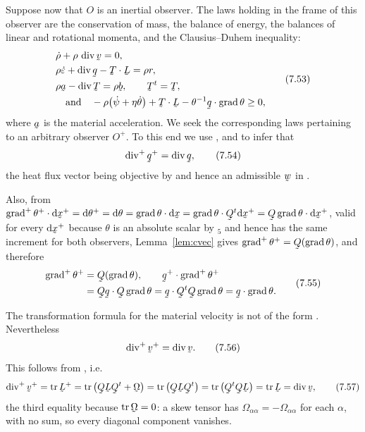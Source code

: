 Suppose now that $O$ is an inertial observer. The laws holding in the
frame of this observer are the conservation of mass, the balance of
energy, the balances of linear and rotational momenta, and the
Clausius--Duhem inequality:
\begin{equation}
\begin{aligned}
   &\dot\rho+\rho\,\dvg\bv=0,\\
   &\rho\dot\eps+\dvg\bq-\bT\cdot\bL=\rho r,\\
   &\rho\ba-\dvg\bT=\rho\bb,\qquad \bT^{t}=\bT,\\
   &\quad\text{and}\quad
   -\rho\big(\dot\psi+\eta\dot\theta\big)+\bT\cdot\bL
   -\theta^{-1}\ip\bq{\grad\theta}\geq0 ,
\end{aligned}
   \tag{7.53}\label{eq:7.53}
\end{equation}
where $\ba$ is the material acceleration. We seek the corresponding laws
pertaining to an arbitrary observer $O^{+}$. To this end we use
,  and  to infer that
\begin{equation}
   \dvg^{+}\bq^{+}=\dvg\bq ,
   \tag{7.54}\label{eq:7.54}
\end{equation}
the heat flux vector being objective by  and hence an
admissible $\bw$ in .

Also, from $\ip{\grad^{+}\theta^{+}}{\dl\bx^{+}}=\dl\theta^{+}
=\dl\theta=\ip{\grad\theta}{\dl\bx}=\ip{\grad\theta}{\bQ^{t}\dl\bx^{+}}
=\ip{\bQ\grad\theta}{\dl\bx^{+}}$, valid for every $\dl\bx^{+}$ because
$\theta$ is an absolute scalar by $_{5}$ and hence has the same
increment for both observers, Lemma~\ref{lem:cvec} gives
$\grad^{+}\theta^{+}=\bQ(\grad\theta)$, and therefore
\begin{equation}
\begin{aligned}
   \grad^{+}\theta^{+}&=\bQ(\grad\theta),
   \qquad
   \ip{\bq^{+}}{\grad^{+}\theta^{+}}\\
   &=\ip{\bQ\bq}{\bQ\grad\theta}
   =\ip\bq{\bQ^{t}\bQ\grad\theta}=\ip\bq{\grad\theta}.
\end{aligned}
   \tag{7.55}\label{eq:7.55}
\end{equation}

The transformation formula  for the material velocity is not of
the form . Nevertheless
\begin{equation}
   \dvg^{+}\bv^{+}=\dvg\bv .
   \tag{7.56}\label{eq:7.56}
\end{equation}
This follows from , i.e.
\begin{equation}
   \dvg^{+}\bv^{+}=\tr\bL^{+}=\tr\big(\bQ\bL\bQ^{t}+\bOm\big)
   =\tr\big(\bQ\bL\bQ^{t}\big)=\tr\big(\bQ^{t}\bQ\bL\big)
   =\tr\bL=\dvg\bv ,
   \tag{7.57}\label{eq:7.57}
\end{equation}
the third equality because $\tr\bOm=0$: a skew tensor has
$\Omega_{\alpha\alpha}=-\Omega_{\alpha\alpha}$ for each $\alpha$, with no
sum, so every diagonal component vanishes.

